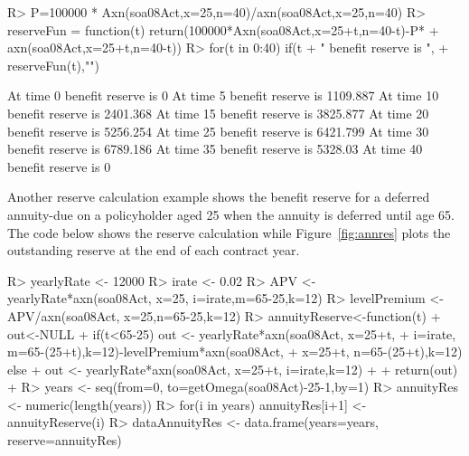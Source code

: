 \documentclass[nojss]{jss}
\begin{document}
\begin{Schunk}
\begin{Sinput}
R> P=100000 * Axn(soa08Act,x=25,n=40)/axn(soa08Act,x=25,n=40)
R> reserveFun = function(t) return(100000*Axn(soa08Act,x=25+t,n=40-t)-P*
+  					axn(soa08Act,x=25+t,n=40-t))
R> for(t in 0:40) {if(t%
+  				" benefit reserve is ", 
+  				reserveFun(t),"\n")}
\end{Sinput}
\begin{Soutput}
At time  0  benefit reserve is  0 
At time  5  benefit reserve is  1109.887 
At time  10  benefit reserve is  2401.368 
At time  15  benefit reserve is  3825.877 
At time  20  benefit reserve is  5256.254 
At time  25  benefit reserve is  6421.799 
At time  30  benefit reserve is  6789.186 
At time  35  benefit reserve is  5328.03 
At time  40  benefit reserve is  0 
\end{Soutput}
\end{Schunk}


Another reserve calculation example shows the benefit reserve for a deferred
annuity-due on a policyholder aged 25 when the annuity is deferred until age 65.
The code below shows the reserve calculation while Figure~\ref{fig:annres} plots
the outstanding reserve at the end of each contract year.

\begin{Schunk}
\begin{Sinput}
R> yearlyRate <- 12000
R> irate <- 0.02
R> APV <- yearlyRate*axn(soa08Act, x=25, i=irate,m=65-25,k=12)
R> levelPremium <- APV/axn(soa08Act, x=25,n=65-25,k=12)
R> annuityReserve<-function(t) {
+  	out<-NULL
+  	if(t<65-25) out <- yearlyRate*axn(soa08Act, x=25+t, 
+      i=irate, m=65-(25+t),k=12)-levelPremium*axn(soa08Act, 
+                x=25+t, n=65-(25+t),k=12) else {
+  		out <- yearlyRate*axn(soa08Act, x=25+t, i=irate,k=12)
+  	}
+  	return(out)
+  }
R> years <- seq(from=0, to=getOmega(soa08Act)-25-1,by=1)
R> annuityRes <- numeric(length(years))
R> for(i in years) annuityRes[i+1] <- annuityReserve(i)
R> dataAnnuityRes <- data.frame(years=years, reserve=annuityRes)
\end{Sinput}
\end{Schunk}
\end{document}
